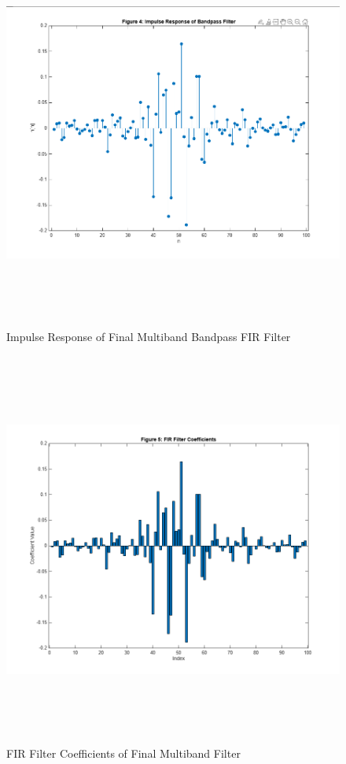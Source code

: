 \documentclass[12pt]{article}
\begin{document}
\begin{figure}[H]
    \centering
    \includegraphics[height=13cm]{4.png}
    \caption{Impulse Response of Final Multiband Bandpass FIR Filter}
    \label{fig:final_impulse_response}
\end{figure}

\begin{figure}[H]
    \centering
    \includegraphics[height=13cm]{5.png}
    \caption{FIR Filter Coefficients of Final Multiband Filter}
    \label{fig:final_coefficients}
\end{figure}
\end{document}
